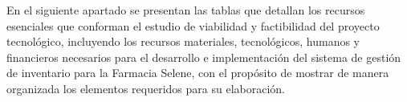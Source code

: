 
\renewcommand{\tablename}{Tabla}
\setcounter{table}{0}
\renewcommand{\thetable}{A.\arabic{table}}

En el siguiente apartado se presentan las tablas que detallan los recursos esenciales que conforman el estudio de viabilidad y factibilidad del proyecto tecnológico, incluyendo los recursos materiales, tecnológicos, humanos y financieros necesarios para el desarrollo e implementación del sistema de gestión de inventario para la Farmacia Selene, con el propósito de mostrar de manera organizada los elementos requeridos para su elaboración.



